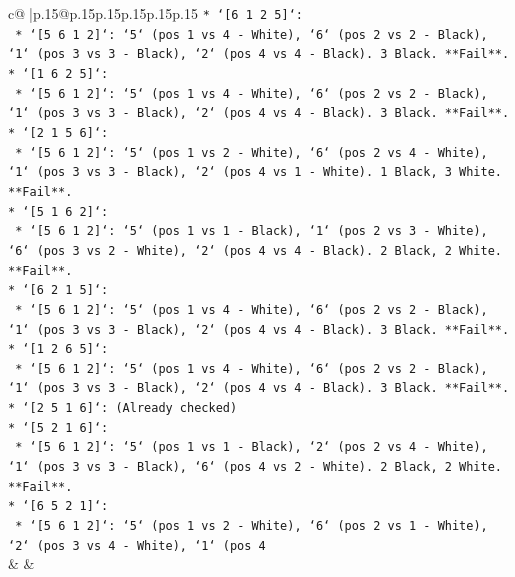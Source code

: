 \documentclass{article}
\begin{document}
{\begin{supertabular}{c@{$\;$}|p{.15\linewidth}@{}p{.15\linewidth}p{.15\linewidth}p{.15\linewidth}p{.15\linewidth}p{.15\linewidth}}
{{{\texttt{*   `{[}6 1 2 5{]}`:} \\
\texttt{    *   `{[}5 6 1 2{]}`: `5` (pos 1 vs 4 {-} White), `6` (pos 2 vs 2 {-} Black), `1` (pos 3 vs 3 {-} Black), `2` (pos 4 vs 4 {-} Black). 3 Black. **Fail**.} \\
\texttt{*   `{[}1 6 2 5{]}`:} \\
\texttt{    *   `{[}5 6 1 2{]}`: `5` (pos 1 vs 4 {-} White), `6` (pos 2 vs 2 {-} Black), `1` (pos 3 vs 3 {-} Black), `2` (pos 4 vs 4 {-} Black). 3 Black. **Fail**.} \\
\texttt{*   `{[}2 1 5 6{]}`:} \\
\texttt{    *   `{[}5 6 1 2{]}`: `5` (pos 1 vs 2 {-} White), `6` (pos 2 vs 4 {-} White), `1` (pos 3 vs 3 {-} Black), `2` (pos 4 vs 1 {-} White). 1 Black, 3 White. **Fail**.} \\
\texttt{*   `{[}5 1 6 2{]}`:} \\
\texttt{    *   `{[}5 6 1 2{]}`: `5` (pos 1 vs 1 {-} Black), `1` (pos 2 vs 3 {-} White), `6` (pos 3 vs 2 {-} White), `2` (pos 4 vs 4 {-} Black). 2 Black, 2 White. **Fail**.} \\
\texttt{*   `{[}6 2 1 5{]}`:} \\
\texttt{    *   `{[}5 6 1 2{]}`: `5` (pos 1 vs 4 {-} White), `6` (pos 2 vs 2 {-} Black), `1` (pos 3 vs 3 {-} Black), `2` (pos 4 vs 4 {-} Black). 3 Black. **Fail**.} \\
\texttt{*   `{[}1 2 6 5{]}`:} \\
\texttt{    *   `{[}5 6 1 2{]}`: `5` (pos 1 vs 4 {-} White), `6` (pos 2 vs 2 {-} Black), `1` (pos 3 vs 3 {-} Black), `2` (pos 4 vs 4 {-} Black). 3 Black. **Fail**.} \\
\texttt{*   `{[}2 5 1 6{]}`: (Already checked)} \\
\texttt{*   `{[}5 2 1 6{]}`:} \\
\texttt{    *   `{[}5 6 1 2{]}`: `5` (pos 1 vs 1 {-} Black), `2` (pos 2 vs 4 {-} White), `1` (pos 3 vs 3 {-} Black), `6` (pos 4 vs 2 {-} White). 2 Black, 2 White. **Fail**.} \\
\texttt{*   `{[}6 5 2 1{]}`:} \\
\texttt{    *   `{[}5 6 1 2{]}`: `5` (pos 1 vs 2 {-} White), `6` (pos 2 vs 1 {-} White), `2` (pos 3 vs 4 {-} White), `1` (pos 4} \\
            }
        }
    }
    & & \\ \\


\end{supertabular}}
\end{document}
